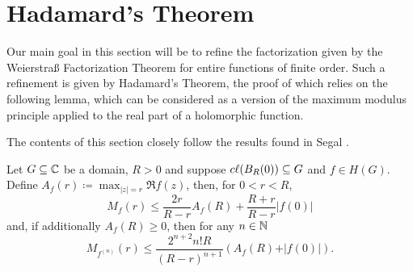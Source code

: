 \section{Hadamard's Theorem} \label{sec:hadamards-theorem}

Our main goal in this section will be to refine the factorization given by the Weierstraß Factorization Theorem for entire functions of finite order. Such a refinement is given by Hadamard's Theorem, the proof of which relies on the following lemma, which can be considered as a version of the maximum modulus principle applied to the real part of a holomorphic function.

The contents of this section closely follow the results found in Segal \cite{segal-complex-analysis}.

\begin{lemma} \label{lem:borel-caratheodory}
    Let $G \subseteq \mathbb{C}$ be a domain, $R > 0$ and suppose $c\ell({B_R(0)}) \subseteq G$ and $f \in H(G)$. Define $ A_f(r) \coloneqq \max_{\vert z \vert = r} \Re f(z) $, then, for $0 < r < R$,
    \begin{equation} \label{eq:borel-caratheodory-1}
        M_f(r) \leq \frac{2r}{R - r} A_f(R) + \frac{R + r}{R - r} \vert f(0) \vert
    \end{equation}
    and, if additionally $A_f(R) \geq 0$, then for any $n \in \mathbb{N}$
    \begin{equation} \label{eq:borel-caratheodory-2}
        M_{f^{(n)}}(r) \leq \frac{2^{n+2} n! R}{(R - r)^{n+1}} (A_f(R) + \vert f(0) \vert).
    \end{equation}
\end{lemma}

